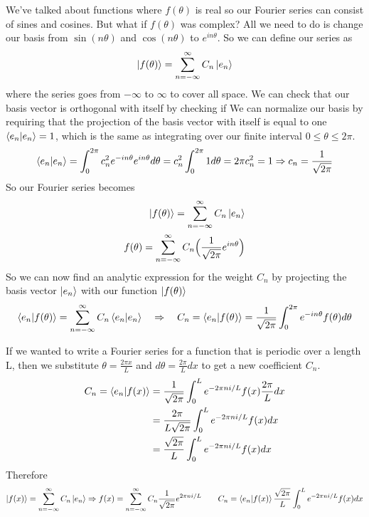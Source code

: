 \documentclass{article}
\newcommand{\be}{\begin{equation}}
\newcommand{\ee}{\end{equation}}
\begin{document}
We've talked about functions where $f(\theta)$ is real so our Fourier series can consist of sines and cosines.
But what if $f(\theta)$ was complex?
All we need to do is change our basis from $\sin(n \theta)$ and $\cos(n \theta)$ to $e^{i n \theta}$.
So we can define our series as
\be
  \ket{f(\theta)} = \sum_{n= - \infty}^{\infty} C_n \ket{e_n}
\ee
where the series goes from $- \infty$ to $\infty$ to cover all space.
We can check that our basis vector is orthogonal with itself by checking if
We can normalize our basis by requiring that the projection of the basis vector with itself is equal to one $\braket{e_n|e_n} = 1$, which is the same as integrating over our finite interval $0 \leq \theta \leq 2 \pi$.
\be
  \braket{e_n | e_n} = \int_{0}^{2 \pi} c_n^2 e^{-i n \theta} e^{i n \theta} d \theta = c_n^2 \int_{0}^{2 \pi} 1 d \theta = 2 \pi c_n^2 = 1 \Rightarrow c_n = \frac{1}{\sqrt{2 \pi}}
\ee
So our Fourier series becomes
\be
  \begin{split}
    \ket{f(\theta)} = \sum_{n= - \infty}^{\infty} C_n \ket{e_n} \\
    f(\theta) = \sum_{n= - \infty}^{\infty} C_n \Big( \frac{1}{\sqrt{2 \pi}} e^{i n \theta} \Big)
  \end{split}
\ee
So we can now find an analytic expression for the weight $C_n$ by projecting the basis vector $\ket{e_n}$ with our function $\ket{f(\theta)}$
\be
  \braket{e_n|f(\theta)} = \sum_{n= - \infty}^{\infty} C_n \braket{e_n|e_n} \quad \Rightarrow \quad C_n = \braket{e_n|f(\theta)} = \frac{1}{\sqrt{2 \pi}} \int_0^{2 \pi} e^{-i n \theta} f(\theta) d \theta
\ee

If we wanted to write a Fourier series for a function that is periodic over a length L, then we substitute $\theta = \frac{2 \pi x}{L}$ and $d\theta = \frac{2 \pi}{L} dx$ to get a new coefficient $C_n$.
\be
  \begin{split}
    C_n = \braket{e_n|f(x)} &= \frac{1}{\sqrt{2 \pi}} \int_0^L e^{- 2 \pi n i / L} f(x) \frac{2 \pi}{L} dx \\
    &= \frac{2 \pi}{L \sqrt{2 \pi}} \int_0^L e^{- 2 \pi n i / L} f(x) dx \\
    &= \frac{\sqrt{2 \pi}}{L} \int_0^L e^{- 2 \pi n i / L} f(x) dx \\
  \end{split}
\ee
Therefore
\be
  \ket{f(x)} = \sum_{n = -\infty}^{\infty} C_n \ket{e_n} \Rightarrow f(x) = \sum_{n = -\infty}^{\infty} C_n \frac{1}{\sqrt{2 \pi}} e^{2 \pi n i / L} \qquad C_n = \braket{e_n|f(x)} \frac{\sqrt{2 \pi}}{L} \int_0^L e^{- 2 \pi n i / L} f(x) dx
\ee
\end{document}
